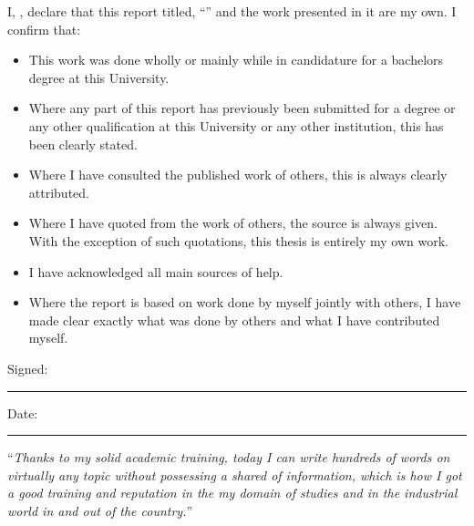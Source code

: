 \documentclass[
11pt, %
english, %
singlespacing, %
headsepline, %
]{InternshipReport} %
\begin{document}

\begin{declaration}
\addchaptertocentry{\authorshipname}

\noindent I, \authorname, declare that this report titled, \enquote{\ttitle} and the work presented in it are my own. I confirm that:

\begin{itemize} 
\item This work was done wholly or mainly while in candidature for a bachelors degree at this University.
\item Where any part of this report has previously been submitted for a degree or any other qualification at this University or any other institution, this has been clearly stated.
\item Where I have consulted the published work of others, this is always clearly attributed.
\item Where I have quoted from the work of others, the source is always given. With the exception of such quotations, this thesis is entirely my own work.
\item I have acknowledged all main sources of help.
\item Where the report is based on work done by myself jointly with others, I have made clear exactly what was done by others and what I have contributed myself.\\
\end{itemize}
 
\noindent Signed:\\
\rule[0.5em]{25em}{0.5pt} %
 
\noindent Date:\\
\rule[0.5em]{25em}{0.5pt} %
\end{declaration}

\cleardoublepage


\vspace*{0.2\textheight}

\noindent\enquote{\itshape Thanks to my solid academic training, today I can write hundreds of words on virtually any topic without possessing a shared of information, which is how I got a good training and reputation in the my domain of studies and in the industrial world in and out of the country.}\bigbreak
\end{document}
